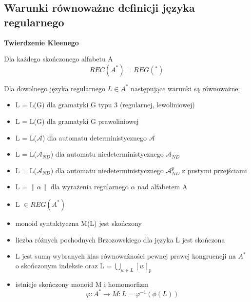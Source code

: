 \documentclass[12pt]{article}
\begin{document}
        \subsection{Warunki równoważne definicji języka regularnego}
        \begin{theorem}
            \textbf{Twierdzenie Kleenego}

            Dla każdego skończonego alfabetu A
            $$REC(A^*) = REG(^*)$$
        \end{theorem}

        \begin{theorem}
            Dla dowolnego języka regularnego $L \in A^*$ następujące warunki są równoważne:
            \begin{itemize}
                \item L = L(G) dla gramatyki G typu 3 (regularnej, lewoliniowej)
                \item L = L(G) dla gramatyki G prawoliniowej
                \item L = L($\mathcal{A}$) dla automatu deterministycznego $\mathcal{A}$
                \item L = L($\mathcal{A}_{ND}$) dla automatu niedeterministycznego $\mathcal{A}_{ND}$
                \item L = L($\mathcal{A}_{ND}$) dla automatu niedeterministycznego $\mathcal{A}_{ND}^p$ z pustymi przejściami

                \item L = $\|\alpha\|$ dla wyrażenia regularnego $\alpha$ nad alfabetem A                
                \item L $\in REG(A^*)$
                \item monoid syntaktyczna M(L) jest skończony
                \item liczba różnych pochodnych Brzozowskiego dla języka
                    L jest skończona
                \item L jest sumą wybranych klas równoważności pewnej prawej kongruencji na $A^*$
                    o skończonym indeksie oraz L = $\bigcup\limits_{w \in L}[w]_p$
                \item istnieje skończony monoid M i homomorfizm
                    $$\varphi : A^* \rightarrow M : L = \varphi^{-1}(\phi(L))$$
            \end{itemize}
        \end{theorem}

        \newpage
\end{document}
